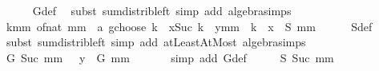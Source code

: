 \begin{isabellebody}
\ \ \ \ \isamarkupfalse%
\ G{\isacharunderscore}{\kern0pt}def\ \isamarkupfalse%
\ {\isacharparenleft}{\kern0pt}subst\ sum{\isacharunderscore}{\kern0pt}distrib{\isacharunderscore}{\kern0pt}left{\isacharparenright}{\kern0pt}\ {\isacharparenleft}{\kern0pt}simp\ add{\isacharcolon}{\kern0pt}\ algebra{\isacharunderscore}{\kern0pt}simps{\isacharparenright}{\kern0pt}\isanewline
\ \ \isamarkupfalse%
\ \isamarkupfalse%
\ {\isachardoublequoteopen}{\isacharparenleft}{\kern0pt}{\isasymSum}k{\isacharequal}{\kern0pt}{}{\isachardot}{\kern0pt}{\isachardot}{\kern0pt}mm{\isachardot}{\kern0pt}\ {\isacharparenleft}{\kern0pt}of{\isacharunderscore}{\kern0pt}nat\ mm\ {\isacharplus}{\kern0pt}\ a\ gchoose\ k{\isacharparenright}{\kern0pt}\ {\isacharasterisk}{\kern0pt}\ x{\isacharcircum}{\kern0pt}{\isacharparenleft}{\kern0pt}Suc\ k{\isacharparenright}{\kern0pt}\ {\isacharasterisk}{\kern0pt}\ y{\isacharcircum}{\kern0pt}{\isacharparenleft}{\kern0pt}mm\ {\isacharminus}{\kern0pt}\ k{\isacharparenright}{\kern0pt}{\isacharparenright}{\kern0pt}\ {\isacharequal}{\kern0pt}\ x\ {\isacharasterisk}{\kern0pt}\ {\isacharparenleft}{\kern0pt}S\ mm{\isacharparenright}{\kern0pt}{\isachardoublequoteclose}\isanewline
\ \ \ \ \isamarkupfalse%
\ S{\isacharunderscore}{\kern0pt}def\ \isamarkupfalse%
\ {\isacharparenleft}{\kern0pt}subst\ sum{\isacharunderscore}{\kern0pt}distrib{\isacharunderscore}{\kern0pt}left{\isacharparenright}{\kern0pt}\ {\isacharparenleft}{\kern0pt}simp\ add{\isacharcolon}{\kern0pt}\ atLeast{}AtMost\ algebra{\isacharunderscore}{\kern0pt}simps{\isacharparenright}{\kern0pt}\isanewline
\ \ \isamarkupfalse%
\ \isamarkupfalse%
\ {\isachardoublequoteopen}{\isacharparenleft}{\kern0pt}G\ {\isacharparenleft}{\kern0pt}Suc\ mm{\isacharparenright}{\kern0pt}\ {}{\isacharparenright}{\kern0pt}\ {\isacharequal}{\kern0pt}\ y\ {\isacharasterisk}{\kern0pt}\ {\isacharparenleft}{\kern0pt}G\ mm\ {}{\isacharparenright}{\kern0pt}{\isachardoublequoteclose}\isanewline
\ \ \ \ \isamarkupfalse%
\ {\isacharparenleft}{\kern0pt}simp\ add{\isacharcolon}{\kern0pt}\ G{\isacharunderscore}{\kern0pt}def{\isacharparenright}{\kern0pt}\isanewline
\ \ \isamarkupfalse%
\ \isamarkupfalse%
\ {\isachardoublequoteopen}S\ {\isacharparenleft}{\kern0pt}Suc\ mm{\isacharparenright}{\kern0pt}\ {\isacharequal}{\kern0pt}\isanewline

\end{isabellebody}
